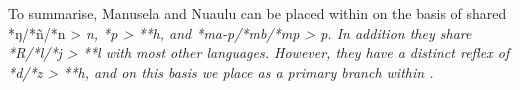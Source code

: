 To summarise,
Manusela and Nuaulu can be placed within  on
the basis of shared *ŋ/*ñ/*n > \it{n},
*p > **h, and *ma-p/*mb/*mp > \it{p}.
In addition they share *R/*l/*j > **l with most other  languages.
However, they have a distinct reflex of *d/*z > **h,
and on this basis we place  as a primary
branch within .
